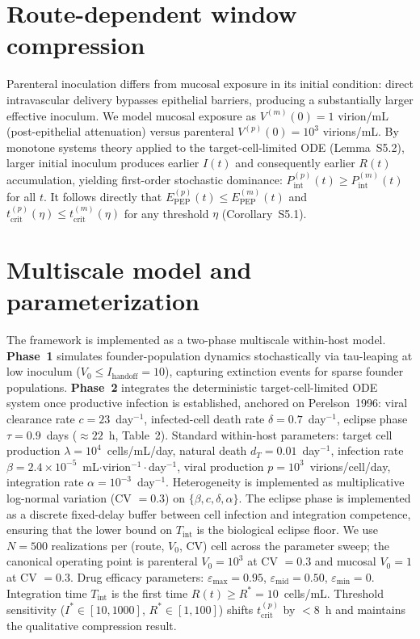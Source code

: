 \documentclass[11pt]{article}
\theoremstyle{definition}
\theoremstyle{remark}
\newcommand{\Tint}{T_{\text{int}}}
\newcommand{\Pint}{P_{\text{int}}}
\newcommand{\Epep}{E_{\text{PEP}}}
\newcommand{\tcrit}{t_{\text{crit}}}
\newcommand{\emax}{\varepsilon_{\max}}
\newcommand{\emid}{\varepsilon_{\text{mid}}}
\newcommand{\emin}{\varepsilon_{\min}}
\begin{document}
\section*{Route-dependent window compression}

Parenteral inoculation differs from mucosal exposure in its initial condition: direct intravascular delivery bypasses epithelial barriers, producing a substantially larger effective inoculum. We model mucosal exposure as $V^{(m)}(0) = 1$ virion/mL (post-epithelial attenuation) versus parenteral $V^{(p)}(0) = 10^{3}$ virions/mL. By monotone systems theory applied to the target-cell-limited ODE (Lemma~S5.2), larger initial inoculum produces earlier $I(t)$ and consequently earlier $R(t)$ accumulation, yielding first-order stochastic dominance: $\Pint^{(p)}(t) \geq \Pint^{(m)}(t)$ for all $t$. It follows directly that $\Epep^{(p)}(t) \leq \Epep^{(m)}(t)$ and $\tcrit^{(p)}(\eta) \leq \tcrit^{(m)}(\eta)$ for any threshold $\eta$ (Corollary~S5.1).

\section*{Multiscale model and parameterization}

The framework is implemented as a two-phase multiscale within-host model. \textbf{Phase~1} simulates founder-population dynamics stochastically via tau-leaping at low inoculum ($V_{0} \leq I_{\text{handoff}} = 10$), capturing extinction events for sparse founder populations. \textbf{Phase~2} integrates the deterministic target-cell-limited ODE system once productive infection is established, anchored on Perelson~1996\cite{perelson1996}: viral clearance rate $c = 23$~day$^{-1}$, infected-cell death rate $\delta = 0.7$~day$^{-1}$, eclipse phase $\tau = 0.9$~days ($\approx 22$~h, Table~2). Standard within-host parameters\cite{mcmichael2010}: target cell production $\lambda = 10^{4}$~cells/mL/day, natural death $d_{T} = 0.01$~day$^{-1}$, infection rate $\beta = 2.4 \times 10^{-5}$~mL$\cdot$virion$^{-1}\cdot$day$^{-1}$, viral production $p = 10^{3}$~virions/cell/day, integration rate $\alpha = 10^{-3}$~day$^{-1}$. Heterogeneity is implemented as multiplicative log-normal variation (CV $= 0.3$) on $\{\beta, c, \delta, \alpha\}$. The eclipse phase is implemented as a discrete fixed-delay buffer between cell infection and integration competence, ensuring that the lower bound on $\Tint$ is the biological eclipse floor. We use $N = 500$ realizations per (route, $V_{0}$, CV) cell across the parameter sweep; the canonical operating point is parenteral $V_{0} = 10^{3}$ at CV $= 0.3$ and mucosal $V_{0} = 1$ at CV $= 0.3$. Drug efficacy parameters: $\emax = 0.95$, $\emid = 0.50$, $\emin = 0$. Integration time $\Tint$ is the first time $R(t) \geq R^{*} = 10$~cells/mL. Threshold sensitivity ($I^{*} \in [10, 1000]$, $R^{*} \in [1, 100]$) shifts $\tcrit^{(p)}$ by $<8$~h and maintains the qualitative compression result.
\end{document}
